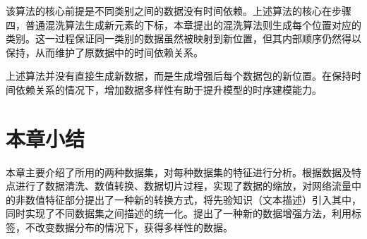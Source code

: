 该算法的核心前提是不同类别之间的数据没有时间依赖。上述算法的核心在步骤四，普通混洗算法生成新元素的下标，本章提出的混洗算法则生成每个位置对应的类别。这一过程保证同一类别的数据虽然被映射到新位置，但其内部顺序仍然得以保持，从而维护了原数据中的时间依赖关系。

上述算法并没有直接生成新数据，而是生成增强后每个数据包的新位置。在保持时间依赖关系的情况下，增加数据多样性有助于提升模型的时序建模能力。


\section{本章小结}
本章主要介绍了所用的两种数据集，对每种数据集的特征进行分析。根据数据及特点进行了数据清洗、数值转换、数据切片过程，实现了数据的缩放，对网络流量中的非数值特征部分提出了一种新的转换方式，将先验知识（文本描述）引入其中，同时实现了不同数据集之间描述的统一化。提出了一种新的数据增强方法，利用标签，不改变数据分布的情况下，获得多样性的数据。
